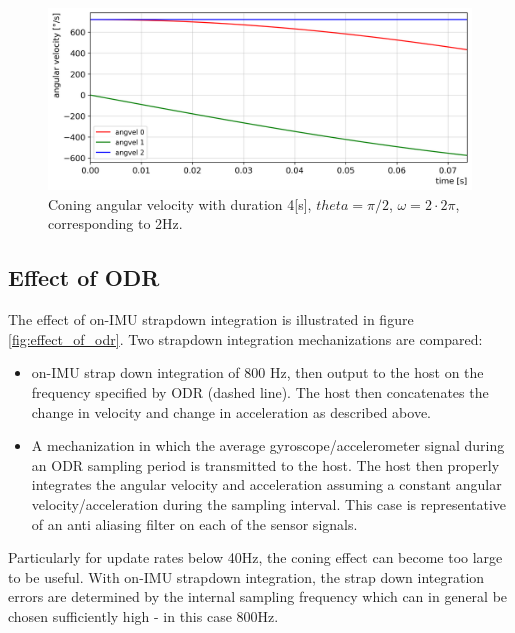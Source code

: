 \documentclass{article}
\begin{document}
\begin{figure}[ht]
\includegraphics[width=.9\textwidth]{angular_velocity_coning.png} 
\caption{Coning angular velocity with duration 4[s], $theta=\pi /2$, $\omega=2\cdot 2 \pi$, corresponding to 2Hz.}
\centering
\end{figure}


\subsection{Effect of ODR}
The effect of on-IMU strapdown integration is illustrated in figure \ref{fig:effect_of_odr}. Two strapdown integration mechanizations are compared:
\begin{itemize}
\item on-IMU strap down integration of 800 Hz, then output to the host on the frequency specified by ODR (dashed line). The host then concatenates the change in velocity and change in acceleration as described above.
\item A mechanization in which the average gyroscope/accelerometer signal during an ODR sampling period is transmitted to the host. The host then properly integrates the angular velocity and acceleration assuming a constant angular velocity/acceleration during the sampling interval. This case is representative of an anti aliasing filter on each of the sensor signals.
\end{itemize}

Particularly for update rates below 40Hz, the coning effect can become too large to be useful. With on-IMU strapdown integration, the strap down integration errors are determined by the internal sampling frequency which can  in general be chosen sufficiently high - in this case 800Hz.
\end{document}
